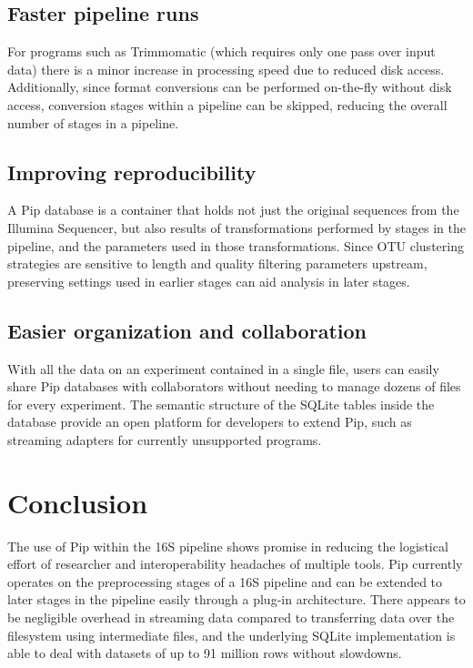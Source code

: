 \documentclass[12pt]{article}
\begin{document}

\subsection{Faster pipeline runs} %
\label{sub:faster_pipeline_runs}
For programs such as Trimmomatic (which requires only one pass over input data) there
is a minor increase in processing speed due to reduced disk access. Additionally, since
format conversions can be performed on-the-fly without disk access, conversion stages
within a pipeline can be skipped, reducing the overall number of stages in a pipeline.

\subsection{Improving reproducibility} %
\label{sub:improving_reproducibility}
A Pip database is a container that holds not just the original sequences from the 
Illumina Sequencer, but also results of transformations performed by stages in 
the pipeline, and the parameters used in those transformations. Since OTU clustering 
strategies are sensitive to length and quality filtering parameters upstream, preserving settings 
used in earlier stages can aid analysis in later stages.

\subsection{Easier organization and collaboration} %
\label{sub:easier_organization_and_collaboration}
With all the data on an experiment contained in a single file, users can easily 
share Pip databases with collaborators without needing to manage dozens of files 
for every experiment. The semantic structure of the SQLite tables inside the database
provide an open platform for developers to extend Pip, such as streaming adapters 
for currently unsupported programs.


\section{Conclusion} %
\label{sec:conclusion}
The use of Pip within the 16S pipeline shows promise in reducing the logistical
effort of researcher and interoperability headaches of multiple tools. Pip currently 
operates on the preprocessing stages of a 16S pipeline and can be extended to later
stages in the pipeline easily through a plug-in architecture. There appears to be 
negligible overhead in streaming data compared to transferring data over the filesystem 
using intermediate files, and the underlying SQLite implementation is able to
deal with datasets of up to 91 million rows without slowdowns.
\end{document}

